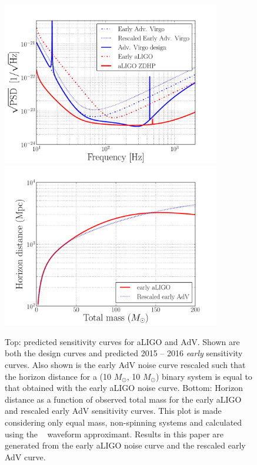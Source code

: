 \begin{figure}
\centering
\includegraphics[width=0.85\textwidth]
{papers/mdc2013_submission/figure2A}
\includegraphics[width=0.85\textwidth]
{papers/mdc2013_submission/figure2B}
\caption{\label{fig:NOISE_design_spectra}
Top: predicted sensitivity curves for aLIGO and
AdV. Shown are both the design curves and predicted 2015 -- 2016
\emph{early} sensitivity curves. Also shown is the early AdV noise curve 
rescaled such that the horizon distance for a (10 $M_{\odot}$, 10 $M_{\odot}$) 
binary system is equal to that obtained with the early aLIGO noise 
curve. Bottom: Horizon distance as a function of observed total mass for the 
early aLIGO and rescaled early AdV sensitivity curves. This plot is 
made considering only equal mass, non-spinning systems and calculated using the 
\eob ~\cite{Pan:2011gk} waveform approximant. Results in this paper are 
generated from the early aLIGO noise curve and the rescaled early AdV curve.}
\end{figure}


